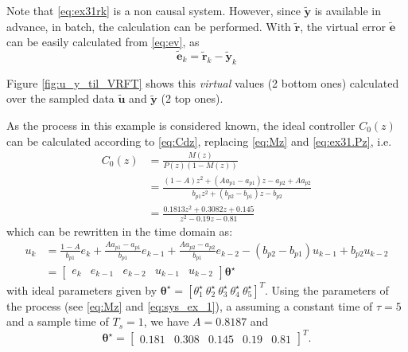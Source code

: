 \begin{exmp}
   Note that \eqref{eq:ex31rk} is a non causal system.
   However, since $\tilde{\bm{y}}$ is available in advance, in batch, the calculation can be performed.
   With $\tilde{\bm{r}}$, the virtual error $\tilde{\bm{e}}$ can be easily calculated from \eqref{eq:ev}, as
   \begin{equation*}
      \tilde{\bm{e}}_k = \tilde{\bm{r}}_k - \tilde{\bm{y}}_k 
   \end{equation*}

   Figure \ref{fig:u_y_til_VRFT} shows this \textit{virtual} values (2 bottom ones) calculated over the sampled data $\tilde{\bm{u}}$ and $\tilde{\bm{y}}$ (2 top ones).

   As the process in this example is considered known, the ideal controller $C_0(z)$ can be calculated according to \eqref{eq:Cdz}, replacing \eqref{eq:Mz} and \eqref{eq:ex31.Pz}, i.e.
   \begin{align}
      C_0(z) &= \frac{M(z)}{P(z)\left(1-M(z)\right)} \\
             &= \frac{(1 - A)z^2 + (Aa_{p1} - a_{p1})z - a_{p2} + Aa_{p2}}{b_{p1}z^2 + (b_{p2} - b_{p1})z - b_{p2}} \\
             &= \frac{0.1813 z^2 + 0.3082 z + 0.145}{ z^2 - 0.19 z - 0.81}
   \end{align}
   which can be rewritten in the time domain as:
   \begin{align}
      \label{eq:exp31_uk}
      u_k &= \frac{1 - A}{b_{p1}}e_k + \frac{Aa_{p1} - a_{p1}}{b_{p1}}e_{k-1} + \frac{Aa_{p2} - a_{p2}}{b_{p1}}e_{k-2} - (b_{p2} - b_{p1})u_{k-1} + b_{p2}u_{k-2} \nonumber\\
          &=\begin{bmatrix} e_k & e_{k-1} & e_{k-2} & u_{k-1} & u_{k-2} \end{bmatrix}  \bm{\theta}^\star
   \end{align}
   with ideal parameters given by $\bm{\theta}^\star = [\theta^\star_1 \ \theta^\star_2 \ \theta^\star_3 \ \theta^\star_4 \ \theta^\star_5]^T$. Using the parameters of the process (see \eqref{eq:Mz} and \eqref{eq:sys_ex_1}), a assuming a constant time of $\tau=5$ and a sample time of $T_s=1$, we have $A= 0.8187$ and 
   \begin{equation}
      \bm{\theta}^{\star}= \begin{bmatrix}   0.181 & 0.308 &  0.145 &  0.19 & 0.81 \end{bmatrix}^T.
      \label{eq:exp31_ideal_parameters}
   \end{equation}


\end{exmp}
